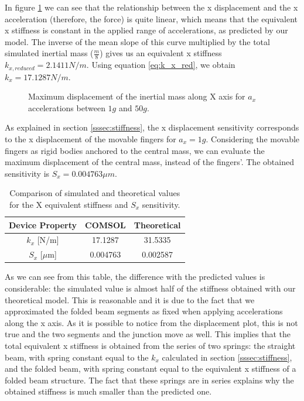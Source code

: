 \documentclass[lettersize,journal]{IEEEtran}
\begin{document}
    In figure \ref{plt:x_disp} we can see that the relationship between the x displacement and the x acceleration (therefore, the force) is quite linear, which means that the equivalent x stiffness is constant in the applied range of accelerations, as predicted by our model. The inverse of the mean slope of this curve multiplied by the total simulated inertial mass (\(\frac{m}{8}\)) gives us an equivalent x stiffness \(k_{x,reduced}=2.1411N/m\). Using equation \ref{eq:k_x_red}, we obtain \(k_x=17.1287N/m\).
    \begin{figure}[!h]
        \centering
        
        \caption{Maximum displacement of the inertial mass along X axis for \(a_x\) accelerations between \(1g\) and \(50g\).}
        \label{plt:x_disp}
    \end{figure}
    
    As explained in section \ref{sssec:stiffness}, the x displacement sensitivity corresponds to the x displacement of the movable fingers for \(a_x=1g\). Considering the movable fingers as rigid bodies anchored to the central mass, we can evaluate the maximum displacement of the central mass, instead of the fingers'. The obtained sensitivity is \(S_x=0.004763\mu m\).
    
    \begin{table}[h]
        \caption{Comparison of simulated and theoretical values for the X equivalent stiffness and \(S_x\) sensitivity.}
        \renewcommand{\arraystretch}{1.5}
        \centering
        \begin{tabular}{|c|c|c|}
            \hline
            \textbf{Device Property} & \textbf{COMSOL} & \textbf{Theoretical}\\ \hline
            \(k_x\) [N/m]       & 17.1287   & 31.5335             \\ \hline
            \(S_x\) [\(\mu\)m]  & 0.004763  & 0.002587              \\ \hline
        \end{tabular}
        \label{tab:ax_sweep_comparison}
    \end{table}
    
    As we can see from this table, the difference with the predicted values is considerable: the simulated value is almost half of the stiffness obtained with our theoretical model. This is reasonable and it is due to the fact that we approximated the folded beam segments as fixed when applying accelerations along the x axis. As it is possible to notice from the displacement plot, this is not true and the two segments and the junction move as well. This implies that the total equivalent x stiffness is obtained from the series of two springs: the straight beam, with spring constant equal to the \(k_x\) calculated in section \ref{sssec:stiffness}, and the folded beam, with spring constant equal to the equivalent x stiffness of a folded beam structure. The fact that these springs are in series explains why the obtained stiffness is much smaller than the predicted one. 
    
\end{document}
